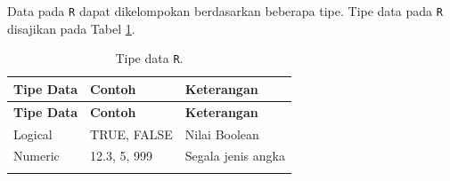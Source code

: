 \documentclass[]{book}
\begin{document}
Data pada \texttt{R} dapat dikelompokan berdasarkan beberapa tipe. Tipe
data pada \texttt{R} disajikan pada Tabel \ref{tab:tipedata}.

\begin{longtable}[]{@{}lll@{}}
\caption{\label{tab:tipedata} Tipe data \texttt{R}.}\tabularnewline
\toprule
\begin{minipage}[b]{0.12\columnwidth}\raggedright\strut
\textbf{Tipe Data}\strut
\end{minipage} & \begin{minipage}[b]{0.19\columnwidth}\raggedright\strut
\textbf{Contoh}\strut
\end{minipage} & \begin{minipage}[b]{0.60\columnwidth}\raggedright\strut
\textbf{Keterangan}\strut
\end{minipage}\tabularnewline
\midrule
\endfirsthead
\toprule
\begin{minipage}[b]{0.12\columnwidth}\raggedright\strut
\textbf{Tipe Data}\strut
\end{minipage} & \begin{minipage}[b]{0.19\columnwidth}\raggedright\strut
\textbf{Contoh}\strut
\end{minipage} & \begin{minipage}[b]{0.60\columnwidth}\raggedright\strut
\textbf{Keterangan}\strut
\end{minipage}\tabularnewline
\midrule
\endhead
\begin{minipage}[t]{0.12\columnwidth}\raggedright\strut
Logical\strut
\end{minipage} & \begin{minipage}[t]{0.19\columnwidth}\raggedright\strut
TRUE, FALSE\strut
\end{minipage} & \begin{minipage}[t]{0.60\columnwidth}\raggedright\strut
Nilai Boolean\strut
\end{minipage}\tabularnewline
\begin{minipage}[t]{0.12\columnwidth}\raggedright\strut
Numeric\strut
\end{minipage} & \begin{minipage}[t]{0.19\columnwidth}\raggedright\strut
12.3, 5, 999\strut
\end{minipage} & \begin{minipage}[t]{0.60\columnwidth}\raggedright\strut
Segala jenis angka\strut
\end{minipage}\tabularnewline
\begin{minipage}[t]{0.12\columnwidth}\raggedright\strut

\end{minipage}
\end{longtable}
\end{document}
